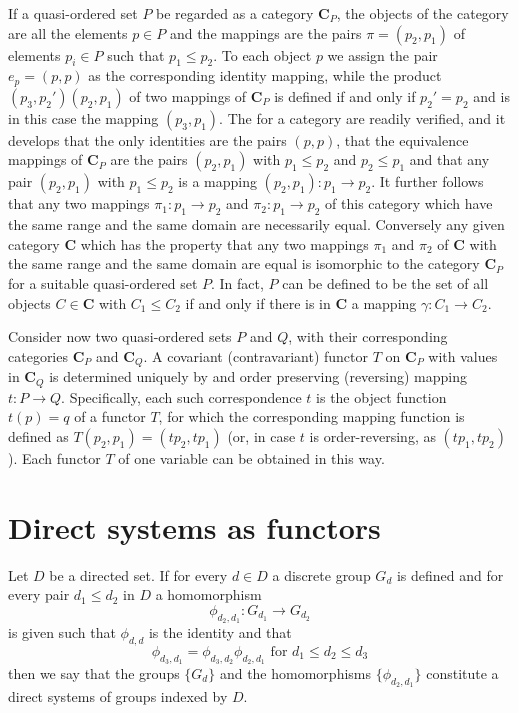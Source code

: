 \documentclass[11pt,a4paper]{report}
\begin{document}
If a quasi\hyp{}ordered set $P$ be regarded as a category $\mathbf{C}_P$, the objects of the category are all the elements $p\in P$ and
the mappings are the pairs $\pi=(p_2,p_1)$ of elements $p_i\in P$ such that $p_1\le p_2$. To each object $p$ we assign 
the pair $e_p=(p,p)$ as the corresponding identity mapping, while the product $(p_3,p_2')(p_2,p_1)$ of two mappings of
$\mathbf{C}_P$ is defined if and only if $p_2'=p_2$ and is in this case the mapping $(p_3,p_1)$. The  for a
category are readily verified, and it develops that the only identities are the pairs $(p,p)$, that the equivalence mappings of 
$\mathbf{C}_P$ are the pairs $(p_2,p_1)$ with $p_1\le p_2$ and $p_2\le p_1$ and that any pair $(p_2,p_1)$ with $p_1\le p_2$
is a mapping $(p_2,p_1):p_1\rightarrow p_2$. It further follows that any two mappings $\pi_1:p_1\rightarrow p_2$ and 
$\pi_2:p_1\rightarrow p_2$ of this category which have the same range and the same domain are necessarily equal. Conversely
any given category $\mathbf{C}$ which has the property that any two mappings $\pi_1$ and $\pi_2$ of $\mathbf{C}$ with the same
range and the same domain are equal is isomorphic to the category $\mathbf{C}_P$ for a suitable quasi\hyp{}ordered set $P$.
In fact, $P$ can be defined to be the set of all objects $C\in\mathbf{C}$ with $C_1\le C_2$ if and only if there is in $\mathbf{C}$
a mapping $\gamma:C_1\rightarrow C_2$.

Consider now two quasi\hyp{}ordered sets $P$ and $Q$, with their corresponding categories $\mathbf{C}_P$ and $\mathbf{C}_Q$. A
covariant (contravariant) functor $T$ on $\mathbf{C}_P$ with values in $\mathbf{C}_Q$ is determined uniquely by and order
preserving (reversing) mapping $t:P\rightarrow Q$. Specifically, each such correspondence $t$ is the object function $t(p)=q$
of a functor $T$, for which the corresponding mapping function is defined as $T(p_2,p_1)= (t p_2, t p_1)$ (or, in case
$t$ is order\hyp{}reversing, as $(t p_1, t p_2)$). Each functor $T$ of one variable can be obtained in this way.

\section{Direct systems as functors}\label{sec:dir-func}
Let $D$ be a directed set. If for every $d\in D$ a discrete group $G_d$ is defined and for every pair $d_1\le d_2$ in $D$ a
homomorphism
\begin{equation}\label{eq:dir-func}
	\phi_{d_2,d_1}:G_{d_1}\rightarrow G_{d_2}
\end{equation}
is given such that $\phi_{d,d}$ is the identity and that
\begin{equation}\label{eq:dir-func-def}
	\phi_{d_3,d_1} =  \phi_{d_3,d_2} \phi_{d_2,d_1}\text{ for } d_1\le d_2\le d_3
\end{equation}
then we say that the groups $\{G_d\}$ and the homomorphisms $\{\phi_{d_2,d_1}\}$ constitute a direct systems of groups indexed
by $D$.
\end{document}
